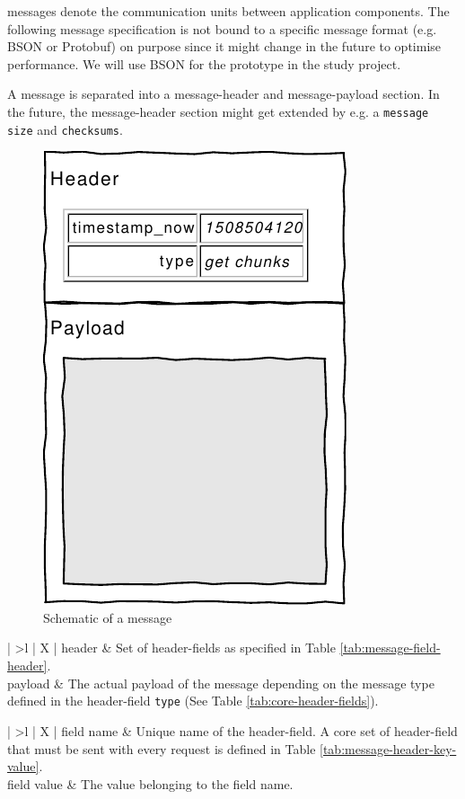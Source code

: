 \Glspl{message} denote the communication units between application components. The following message specification is not bound to a specific message format (e.g. BSON or Protobuf) on purpose since it might change in the future to optimise performance. We will use BSON for the prototype in the study project.

A \gls{message} is separated into a \gls{message-header} and \gls{message-payload} section. In the future, the \gls{message-header} section might get extended by e.g. a \texttt{message size} and \texttt{checksums}.

\begin{figure}[h]
    \centering
    \includegraphics[width=0.3\linewidth]{resources/message_schematic}
    \caption[\Gls{message} Schematic]{Schematic of a \gls{message}}
    \label{fig:messageschematic}
\end{figure}

\begin{table}[h!]
    \begin{tabu}{| >{\ttfamily}l | X |}
        \hline
        header
        & Set of \glspl{header-field} as specified in Table \ref{tab:message-field-header}. \\
        
        \hline
        payload
        & The actual payload of the message depending on the message type defined in the \gls{header-field} \texttt{type} (See Table \ref{tab:core-header-fields}). \\

        \hline
    \end{tabu}
    \caption[\Gls{message} Structure]{Structure of a \gls{message}.}
    \label{tab:message}
\end{table}

\begin{table}[h!]
\begin{tabu}{| >{\ttfamily}l | X |}
    \hline
    field name
    & Unique name of the \gls{header-field}. A core set of \gls{header-field} that must be sent with every request is defined in Table \ref{tab:message-header-key-value}. \\
    
    \hline
    field value
    & The value belonging to the field name. \\

    \hline
\end{tabu}
\caption{Structure of a \gls{header-field}.}
\label{tab:message-field-header}
\end{table}


